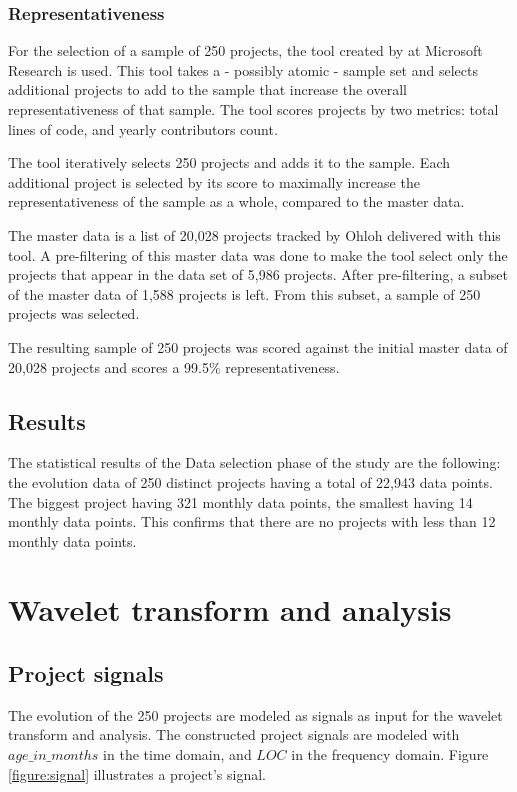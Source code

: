 \subsubsection{Representativeness}
For the selection of a sample of 250 projects, the tool created by
\citet{nagappan} at Microsoft Research is used. This tool takes a - possibly
atomic - sample set and selects additional projects to add to the sample that
increase the overall representativeness of that sample. The tool scores
projects by two metrics: total lines of code, and yearly contributors count.

The tool iteratively selects 250 projects and adds it to the sample. Each
additional project is selected by its score to maximally increase the
representativeness of the sample as a whole, compared to the master data.

The master data is a list of 20,028 projects tracked by Ohloh delivered with
this tool. A pre-filtering of this master data was done to make the tool select
only the projects that appear in the data set of 5,986 projects. After
pre-filtering, a subset of the master data of 1,588 projects is left. From this
subset, a sample of 250 projects was selected.

The resulting sample of 250 projects was scored against the initial master data
of 20,028 projects and scores a 99.5\% representativeness.

\subsection{Results}
The statistical results of the Data selection phase of the study are the
following: the evolution data of 250 distinct projects having a total of 22,943
data points. The biggest project having 321 monthly data points, the smallest
having 14 monthly data points. This confirms that there are no projects with
less than 12 monthly data points.

\section{Wavelet transform and analysis}
\subsection{Project signals}
\label{section:signals}
The evolution of the 250 projects are modeled as signals as input for the
wavelet transform and analysis. The constructed project signals are modeled with
$age\_in\_months$ in the time domain, and $LOC$ in the frequency domain. Figure
\ref{figure:signal} illustrates a project's signal.

